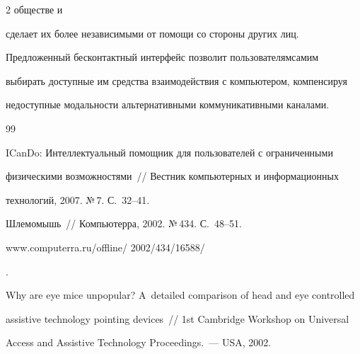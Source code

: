 \begin{multicols}{2}
обществе и 


сделает их более независимыми от помощи со стороны других лиц. 


Предложенный бесконтактный интерфейс позволит пользователям\linebreak самим 


выбирать доступные им средства взаимодействия с компьютером, компенсируя 


недоступные модальности альтернативными коммуникативными каналами.





{\small\frenchspacing


{%




\begin{thebibliography}{99}





  






ICanDo: Интеллектуальный помощник для пользователей с ограниченными 


физическими возможностями~// Вестник компьютерных и информационных 


технологий, 2007. №\,7. С.~32--41.









Шлемомышь~// Компьютерра, 2002. №\,434. С.~48--51. {\sf 


www.computerra.ru/offline/ 2002/434/16588/}.









Why are eye mice unpopular? A~detailed comparison of head and eye controlled 


assistive technology pointing devices~// 1st Cambridge Workshop on Universal 


Access and Assistive Technology Proceedings.~--- USA, 2002.










\end{thebibliography}}}
\end{multicols}
